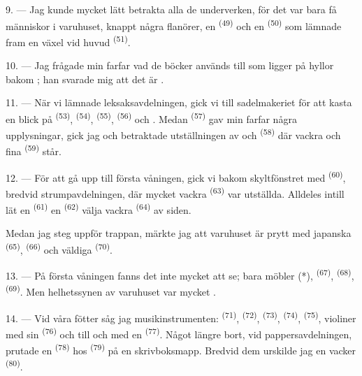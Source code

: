 9. --- Jag kunde mycket lätt betrakta alla de underverken, för det var bara få människor i
varuhuset, knappt några flanörer, en  \textsuperscript{(49)} och en
 \textsuperscript{(50)} som lämnade fram en växel vid huvud
\textsuperscript{(51)}.

10. --- Jag frågade min farfar vad de böcker används till som ligger på hyllor bakom
; han svarade mig att det är .

\VUsaut{3.6mm}
\VUsaut{2.8mm}

11. --- När vi lämnade leksaksavdelningen, gick vi till sadelmakeriet för att kasta en blick
på  \textsuperscript{(53)},
 \textsuperscript{(54)}, 
\textsuperscript{(55)},  \textsuperscript{(56)} och
. Medan  \textsuperscript{(57)} gav
min farfar några upplysningar, gick jag och betraktade utställningen av
 och  \textsuperscript{(58)} där vackra
 och fina  \textsuperscript{(59)} står.

12. --- För att gå upp till första våningen, gick vi bakom skyltfönstret med
 \textsuperscript{(60)}, bredvid strumpavdelningen, där mycket
vackra  \textsuperscript{(63)} var utställda. Alldeles intill lät en
 \textsuperscript{(61)} en  \textsuperscript{(62)} välja
vackra  \textsuperscript{(64)} av siden.

Medan jag steg uppför trappan, märkte jag att varuhuset är prytt med japanska
 \textsuperscript{(65)}, 
\textsuperscript{(66)} och väldiga  \textsuperscript{(70)}.

13. --- På första våningen fanns det inte mycket att se; bara möbler (*),
 \textsuperscript{(67)}, 
\textsuperscript{(68)},  \textsuperscript{(69)}. Men helhetssynen av
varuhuset var mycket .

14. --- Vid våra fötter såg jag musikinstrumenten:  \textsuperscript{(71)},
 \textsuperscript{(72)},
 \textsuperscript{(73)}, 
\textsuperscript{(74)},  \textsuperscript{(75)}, violiner med sin
 \textsuperscript{(76)} och till och med en 
\textsuperscript{(77)}. Något längre bort, vid pappersavdelningen, prutade en 
\textsuperscript{(78)} hos  \textsuperscript{(79)} på en skrivboksmapp.
Bredvid dem urskilde jag en vacker
 \textsuperscript{(80)}.

